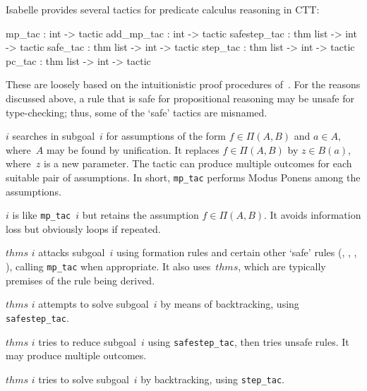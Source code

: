 Isabelle provides several tactics for predicate calculus reasoning in CTT:
\begin{ttbox}
mp_tac       : int -> tactic
add_mp_tac   : int -> tactic
safestep_tac : thm list -> int -> tactic
safe_tac     : thm list -> int -> tactic
step_tac     : thm list -> int -> tactic
pc_tac       : thm list -> int -> tactic
\end{ttbox}
These are loosely based on the intuitionistic proof procedures
of~.  For the reasons discussed above, a rule that is safe for
propositional reasoning may be unsafe for type-checking; thus, some of the
`safe' tactics are misnamed.
\begin{ttdescription}
\item[\ttindexbold{mp_tac} $i$] 
searches in subgoal~$i$ for assumptions of the form $f\in\Pi(A,B)$ and
$a\in A$, where~$A$ may be found by unification.  It replaces
$f\in\Pi(A,B)$ by $z\in B(a)$, where~$z$ is a new parameter.  The tactic
can produce multiple outcomes for each suitable pair of assumptions.  In
short, {\tt mp_tac} performs Modus Ponens among the assumptions.

\item[\ttindexbold{add_mp_tac} $i$]
is like {\tt mp_tac}~$i$ but retains the assumption $f\in\Pi(A,B)$.  It
avoids information loss but obviously loops if repeated.

\item[\ttindexbold{safestep_tac} $thms$ $i$]
attacks subgoal~$i$ using formation rules and certain other `safe' rules
(, , , ), calling
{\tt mp_tac} when appropriate.  It also uses~$thms$,
which are typically premises of the rule being derived.

\item[\ttindexbold{safe_tac} $thms$ $i$] attempts to solve subgoal~$i$ by
  means of backtracking, using {\tt safestep_tac}.

\item[\ttindexbold{step_tac} $thms$ $i$]
tries to reduce subgoal~$i$ using {\tt safestep_tac}, then tries unsafe
rules.  It may produce multiple outcomes.

\item[\ttindexbold{pc_tac} $thms$ $i$]
tries to solve subgoal~$i$ by backtracking, using {\tt step_tac}.
\end{ttdescription}



